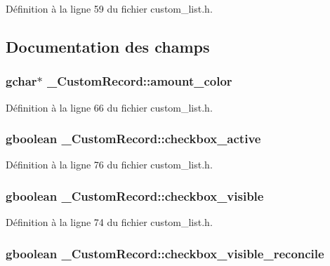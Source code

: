 Définition à la ligne 59 du fichier custom\_\-list.h.



\subsection{Documentation des champs}
\subsubsection[{amount\_\-color}]{\setlength{\rightskip}{0pt plus 5cm}gchar$\ast$ {\bf \_\-CustomRecord::amount\_\-color}}\label{struct__CustomRecord_a66af8b318031a32f0cec97a5f2701dfb}


Définition à la ligne 66 du fichier custom\_\-list.h.

\subsubsection[{checkbox\_\-active}]{\setlength{\rightskip}{0pt plus 5cm}gboolean {\bf \_\-CustomRecord::checkbox\_\-active}}\label{struct__CustomRecord_a681f7dfdab3c9727bfe2e651671f370a}


Définition à la ligne 76 du fichier custom\_\-list.h.

\subsubsection[{checkbox\_\-visible}]{\setlength{\rightskip}{0pt plus 5cm}gboolean {\bf \_\-CustomRecord::checkbox\_\-visible}}\label{struct__CustomRecord_a3f3cc89b6cd038db091b0d5fed5e28d3}


Définition à la ligne 74 du fichier custom\_\-list.h.

\subsubsection[{checkbox\_\-visible\_\-reconcile}]{\setlength{\rightskip}{0pt plus 5cm}gboolean {\bf \_\-CustomRecord::checkbox\_\-visible\_\-reconcile}}\label{struct__CustomRecord_ad15d63daf2ab88634558151d15e5017c}


